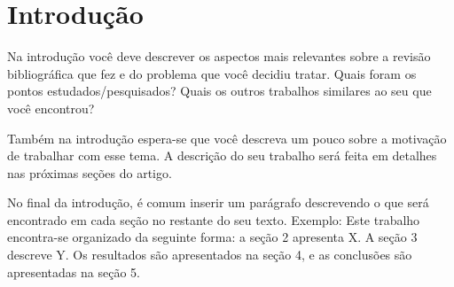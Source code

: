 \section{Introdução}

Na introdução você deve descrever os aspectos mais relevantes sobre a revisão bibliográfica que fez e do problema que você decidiu tratar. Quais foram os pontos estudados/pesquisados? Quais os outros trabalhos similares ao seu que você encontrou? 

Também na introdução espera-se que você descreva um pouco sobre a motivação de trabalhar com esse tema. A descrição do seu trabalho será feita em detalhes nas próximas seções do artigo.


No final da introdução, é comum inserir um parágrafo descrevendo o que será encontrado em cada seção no restante do seu texto. Exemplo: Este trabalho encontra-se organizado da seguinte forma: a seção 2 apresenta X. A seção 3 descreve Y. Os resultados são apresentados na seção 4, e as conclusões são apresentadas na seção 5.